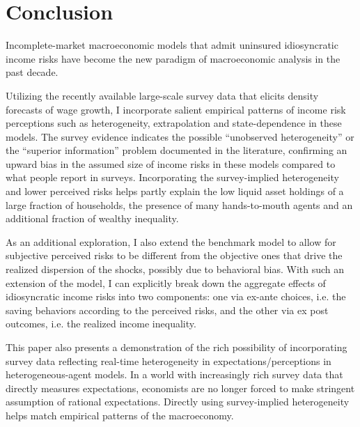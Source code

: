 \hypertarget{conclusion}{%
\section{Conclusion}\label{conclusion}}

Incomplete-market macroeconomic models that admit uninsured idiosyncratic income risks have become the new paradigm of macroeconomic analysis in the past decade. 


Utilizing the recently available large-scale survey data that elicits density forecasts of wage growth, I incorporate salient empirical patterns of income risk perceptions such as heterogeneity, extrapolation and state-dependence in these models. The survey evidence indicates the possible ``unobserved heterogeneity'' or the ``superior information'' problem documented in the literature, confirming an upward bias in the assumed size of income risks in these models compared to what people report in surveys. Incorporating the survey-implied heterogeneity and lower perceived risks helps partly explain the low liquid asset holdings of a large fraction of households, the presence of many hands-to-mouth agents and an additional fraction of wealthy inequality. 

As an additional exploration, I also extend the benchmark model to allow for subjective perceived risks to be different from the objective ones that drive the realized dispersion of the shocks, possibly due to behavioral bias. With such an extension of the model, I can explicitly break down the aggregate effects of idiosyncratic income risks into two components: one via ex-ante choices, i.e. the saving behaviors according to the perceived risks, and the other via ex post outcomes, i.e. the realized income inequality.  

This paper also presents a demonstration of the rich possibility of incorporating survey data reflecting real-time heterogeneity in expectations/perceptions in heterogeneous-agent models. In a world with increasingly rich survey data that directly measures expectations, economists are no longer forced to make stringent  assumption of rational expectations. Directly using survey-implied heterogeneity helps match empirical patterns of the macroeconomy. 
